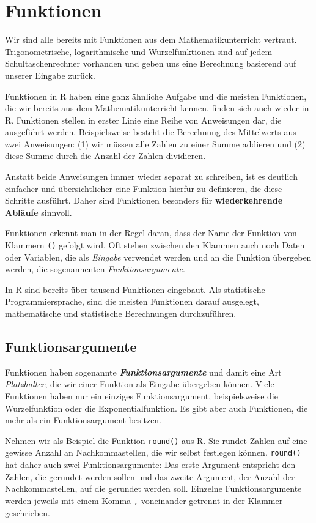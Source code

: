\documentclass[
  ngerman,
]{book}
\begin{document}
\section{Funktionen}\label{funktionen}

Wir sind alle bereits mit Funktionen aus dem Mathematikunterricht vertraut. Trigonometrische, logarithmische und Wurzelfunktionen sind auf jedem Schultaschenrechner vorhanden und geben uns eine Berechnung basierend auf unserer Eingabe zurück.

Funktionen in R haben eine ganz ähnliche Aufgabe und die meisten Funktionen, die wir bereits aus dem Mathematikunterricht kennen, finden sich auch wieder in R. Funktionen stellen in erster Linie eine Reihe von Anweisungen dar, die ausgeführt werden. Beispielsweise besteht die Berechnung des Mittelwerts aus zwei Anweisungen: (1) wir müssen alle Zahlen zu einer Summe addieren und (2) diese Summe durch die Anzahl der Zahlen dividieren.

Anstatt beide Anweisungen immer wieder separat zu schreiben, ist es deutlich einfacher und übersichtlicher eine Funktion hierfür zu definieren, die diese Schritte ausführt. Daher sind Funktionen besonders für \textbf{wiederkehrende Abläufe} sinnvoll.

Funktionen erkennt man in der Regel daran, dass der Name der Funktion von Klammern \texttt{()} gefolgt wird. Oft stehen zwischen den Klammen auch noch Daten oder Variablen, die als \emph{Eingabe} verwendet werden und an die Funktion übergeben werden, die sogenannenten \emph{Funktionsargumente}.

In R sind bereits über tausend Funktionen eingebaut. Als statistische Programmiersprache, sind die meisten Funktionen darauf ausgelegt, mathematische und statistische Berechnungen durchzuführen.

\subsection{Funktionsargumente}\label{funktionsargumente}

Funktionen haben sogenannte \textbf{\emph{Funktionsargumente}} und damit eine Art \emph{Platzhalter}, die wir einer Funktion als Eingabe übergeben können. Viele Funktionen haben nur ein einziges Funktionsargument, beispielsweise die Wurzelfunktion oder die Exponentialfunktion. Es gibt aber auch Funktionen, die mehr als ein Funktionsargument besitzen.

Nehmen wir als Beispiel die Funktion \texttt{round()} aus R. Sie rundet Zahlen auf eine gewisse Anzahl an Nachkommastellen, die wir selbst festlegen können. \texttt{round()} hat daher auch zwei Funktionsargumente: Das erste Argument entspricht den Zahlen, die gerundet werden sollen und das zweite Argument, der Anzahl der Nachkommastellen, auf die gerundet werden soll. Einzelne Funktionsargumente werden jeweils mit einem Komma \texttt{,} voneinander getrennt in der Klammer geschrieben.
\end{document}
